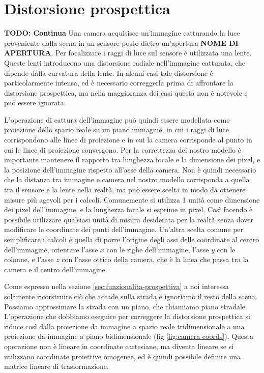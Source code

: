 \chapter{Distorsione prospettica}
\label{sec:prospettiva}

\textbf{TODO: Continua}
Una camera acquisisce un'immagine catturando la luce proveniente dalla scena in un sensore posto dietro un'apertura \textbf{NOME DI APERTURA}.
Per focalizzare i raggi di luce sul sensore è utilizzata una lente.
Queste lenti introducono una distorsione radiale nell'immagine catturata, che dipende dalla curvatura della lente.
In alcuni casi tale distorsione è particolarmente intensa, ed è necessario correggerla prima di affrontare la distorsione prospettica, ma nella maggioranza dei casi questa non è notevole e può essere ignorata.

L'operazione di cattura dell'immagine può quindi essere modellata come proiezione dello spazio reale su un piano immagine, in cui i raggi di luce corrispondono alle linee di proiezione e in cui la camera corrisponde al punto in cui le linee di proiezione convergono.
Per la correttezza del nostro modello è importante mantenere il rapporto tra lunghezza focale e la dimensione dei pixel, e la posizione dell'immagine rispetto all'asse della camera.
Non è quindi necessario che la distanza tra immagine e camera nel nostro modello corrisponda a quella tra il sensore e la lente nella realtà, ma può essere scelta in modo da ottenere misure più agevoli per i calcoli.
Comunemente si utilizza 1 unità come dimensione dei pixel dell'immagine, e la lunghezza focale si esprime in pixel.
Così facendo è possibile utilizzare qualsiasi unità di misura desiderata per la realtà senza dover modificare le coordinate dei punti dell'immagine.
Un'altra scelta comune per semplificare i calcoli è quella di porre l'origine degli assi delle coordinate al centro dell'immagine, orientare l'asse $x$ con le righe dell'immagine, l'asse $y$ con le colonne, e l'asse $z$ con l'asse ottico della camera, che è la linea che passa tra la camera e il centro dell'immagine.

Come espresso nella sezione \ref{sec:funzionalita-prospettiva} a noi interessa solamente ricorstruire ciò che accade sulla strada e ignoriamo il resto della scena.
Possiamo approssimare la strada con un piano, che chiamiamo piano stradale.
L'operazione che dobbiamo eseguire per correggere la distorsione prospettica si riduce così dalla proiezione da immagine a spazio reale tridimensionale a una proiezione da immagine a piano bidimensionale (fig \ref{fig:camera coords}).
Questa operazione non è lineare in coordinate cartesiane, ma diventa lineare se si utilizzano coordinate proiettive omogenee, ed è quindi possibile definire una matrice lineare di trasformazione.


